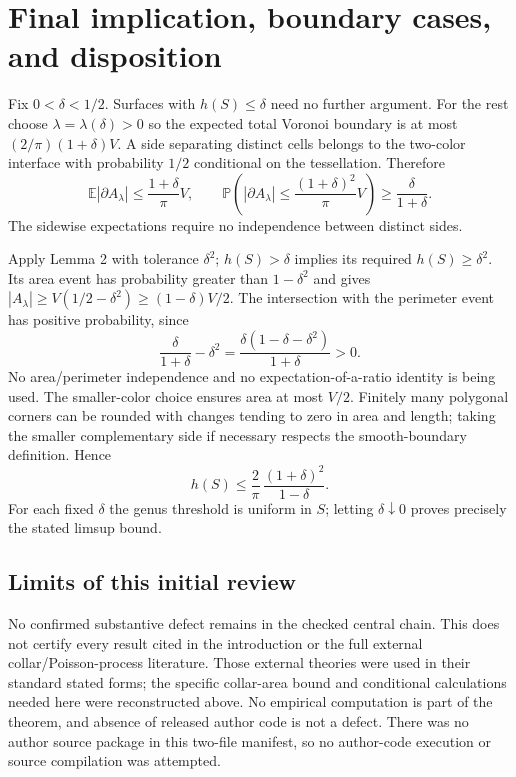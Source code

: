 \documentclass[10pt]{article}
\begin{document}
\section*{Final implication, boundary cases, and disposition}
Fix \(0<\delta<1/2\). Surfaces with \(h(S)\leq\delta\) need no further argument. For the rest choose \(\lambda=\lambda(\delta)>0\) so the expected total Voronoi boundary is at most \((2/\pi)(1+\delta)V\). A side separating distinct cells belongs to the two-color interface with probability \(1/2\) conditional on the tessellation. Therefore \[\mathbb E|\partial A_\lambda|\leq \frac{1+\delta}{\pi}V,\qquad
 \mathbb P\!\left(|\partial A_\lambda|\leq
 \frac{(1+\delta)^2}{\pi}V\right)\geq\frac{\delta}{1+\delta}.\] The sidewise expectations require no independence between distinct sides.\par
Apply Lemma 2 with tolerance \(\delta^2\); \(h(S)>\delta\) implies its required \(h(S)\geq\delta^2\). Its area event has probability greater than \(1-\delta^2\) and gives \(|A_\lambda|\geq V(1/2-\delta^2)\geq(1-\delta)V/2\). The intersection with the perimeter event has positive probability, since \[\frac{\delta}{1+\delta}-\delta^2
 =\frac{\delta(1-\delta-\delta^2)}{1+\delta}>0.\] No area/perimeter independence and no expectation-of-a-ratio identity is being used. The smaller-color choice ensures area at most \(V/2\). Finitely many polygonal corners can be rounded with changes tending to zero in area and length; taking the smaller complementary side if necessary respects the smooth-boundary definition. Hence \[h(S)\leq\frac2\pi\,\frac{(1+\delta)^2}{1-\delta}.\] For each fixed \(\delta\) the genus threshold is uniform in \(S\); letting \(\delta\downarrow0\) proves precisely the stated limsup bound.\par
\subsection*{Limits of this initial review}
No confirmed substantive defect remains in the checked central chain. This does not certify every result cited in the introduction or the full external collar/Poisson-process literature. Those external theories were used in their standard stated forms; the specific collar-area bound and conditional calculations needed here were reconstructed above. No empirical computation is part of the theorem, and absence of released author code is not a defect. There was no author source package in this two-file manifest, so no author-code execution or source compilation was attempted.\par
\end{document}
